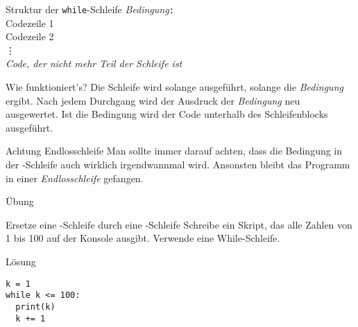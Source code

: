 \begin{frame}

\renewcommand{\baselinestretch}{1.5}
\begin{block}{Struktur der \texttt{while}-Schleife}
	\vspace{2pt}
	\pause {} \pause \textit{Bedingung}\pause\texttt{:} \pause \\
	\spacechar\spacechar Codezeile 1 \pause \\ 
	\spacechar\spacechar Codezeile 2 \pause \\
	\spacechar\spacechar \phantom{Code} \vdots \pause  \\
	\textit{Code, der nicht mehr Teil der Schleife ist}
\end{block}
\vspace{12pt}
\pause 
{}
\renewcommand{\baselinestretch}{1}
\begin{block}{Wie funktioniert's?}
	\vspace{2pt}
	Die Schleife wird solange ausgeführt, solange die \emph{Bedingung}  ergibt. Nach jedem Durchgang wird der Ausdruck der \emph{Bedingung} neu ausgewertet. 
	Ist die Bedingung  wird der Code unterhalb des Schleifenblocks ausgeführt. 
\end{block}

\end{frame}

\begin{frame}
\begin{alertblock}{Achtung Endlosschleife}
	\vspace{2pt}
	Man sollte immer darauf achten, dass die Bedingung in der -Schleife auch wirklich irgendwannmal  wird. Ansonsten bleibt das Programm in einer \emph{Endlosschleife} gefangen. 
\end{alertblock}
\end{frame}


\begin{fragile}{Übung}

\begin{block}{Ersetze eine -Schleife durch eine -Schleife}
\vspace{2pt}
Schreibe ein Skript, das alle Zahlen von 1 bis 100 auf der Konsole ausgibt. Verwende eine While-Schleife.
\vspace{12pt}
\begin{solutionblock}{Lösung}
\begin{verbatim}
k = 1
while k <= 100:
  print(k)
  k += 1
\end{verbatim}
\end{solutionblock}
\end{block}
\end{fragile}



